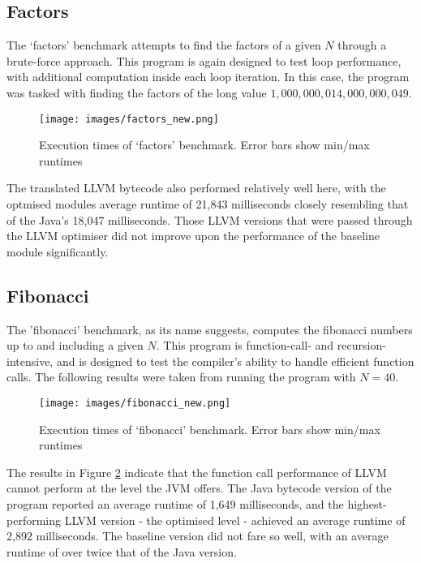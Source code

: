 \subsection*{Factors}

The `factors' benchmark attempts to find the factors of a given $N$ through a brute-force approach. This program is again designed to test loop performance, with additional computation inside each loop iteration. In this case, the program was tasked with finding the factors of the long value $1,000,000,014,000,000,049$.

\begin{figure}[h!]
    \centering
    \texttt{[image: images/factors\_new.png]}
    \caption[Execution times of `factors' benchmark]{Execution times of `factors' benchmark. Error bars show min/max runtimes}
    \label{fig:res_factors}
\end{figure}

The translated LLVM bytecode also performed relatively well here, with the optmised modules average runtime of 21,843 milliseconds closely resembling that of the Java's 18,047 milliseconds. Those LLVM versions that were passed through the LLVM optimiser did not improve upon the performance of the baseline module significantly.


\subsection*{Fibonacci}

The 'fibonacci' benchmark, as its name suggests, computes the fibonacci numbers up to and including a given $N$. This program is function-call- and recursion-intensive, and is designed to test the compiler's ability to handle efficient function calls. The following results were taken from running the program with $N = 40$.

\begin{figure}[h!]
    \centering
    \texttt{[image: images/fibonacci\_new.png]}
    \caption[Execution times of `fibonacci' benchmark]{Execution times of `fibonacci' benchmark. Error bars show min/max runtimes}
    \label{fig:res_fibonacci}
\end{figure}

The results in Figure \ref{fig:res_fibonacci} indicate that the function call performance of LLVM cannot perform at the level the JVM offers. The Java bytecode version of the program reported an average runtime of 1,649 milliseconds, and the highest-performing LLVM version - the optimised level - achieved an average runtime of 2,892 milliseconds. The baseline version did not fare so well, with an average runtime of over twice that of the Java version.


